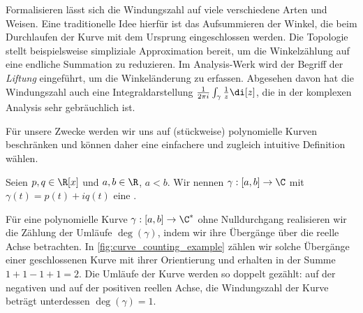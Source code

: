 \documentclass{mythesis}
\begin{document}
Formalisieren lässt sich die Windungszahl auf viele verschiedene Arten und Weisen.
Eine traditionelle Idee hierfür ist das Aufsummieren der Winkel, die beim Durchlaufen der Kurve mit dem Ursprung eingeschlossen werden.
Die Topologie stellt beispielsweise simpliziale Approximation bereit, um die Winkelzählung auf eine endliche Summation zu reduzieren.
Im Analysis-Werk \cite[§12.7]{koenigsberger2003analysis} wird der Begriff der \emph{Liftung} eingeführt, um die Winkeländerung zu erfassen.
Abgesehen davon hat die Windungszahl auch eine Integraldarstellung $\frac{1}{2\pi i} \int_{\gamma} \frac{1}{z} \di[z]$, die in der komplexen Analysis sehr gebräuchlich ist.

Für unsere Zwecke werden wir uns auf (stückweise) polynomielle Kurven beschränken und können daher eine einfachere und zugleich intuitive Definition wählen.

\begin{definition}
    Seien $p, q \in \R[x]$ und $a, b \in \R$, $a < b$.
    Wir nennen $\gamma: [a, b] \to \C$ mit $\gamma(t) = p(t) + iq(t)$ eine .
\end{definition}

Für eine polynomielle Kurve $\gamma: [a,b] \to \C^*$ ohne Nulldurchgang realisieren wir die Zählung der Umläufe $\deg(\gamma)$, indem wir ihre Übergänge über die reelle Achse betrachten.
In \ref{fig:curve_counting_example} zählen wir solche Übergänge einer geschlossenen Kurve mit ihrer Orientierung und erhalten in der Summe $1 + 1 - 1 + 1 = 2$.
Die Umläufe der Kurve werden so doppelt gezählt: auf der negativen und auf der positiven reellen Achse, die Windungszahl der Kurve beträgt unterdessen $\deg(\gamma) = 1$.
\end{document}

